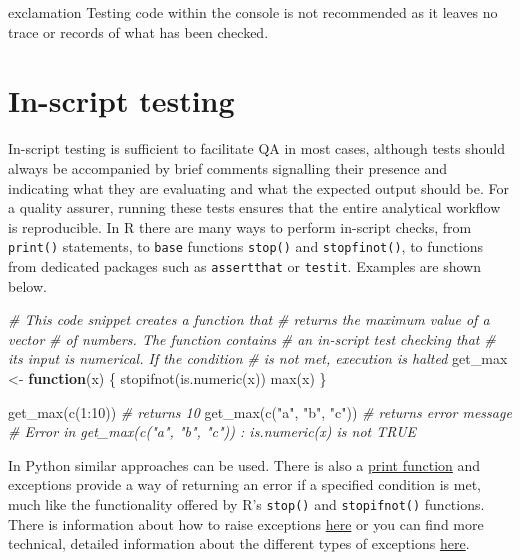 \documentclass[
]{book}
\newenvironment{Shaded}{\begin{snugshade}}{\end{snugshade}}
\newcommand{\CommentTok}[1]{\textcolor[rgb]{0.56,0.35,0.01}{\textit{#1}}}
\newcommand{\ControlFlowTok}[1]{\textcolor[rgb]{0.13,0.29,0.53}{\textbf{#1}}}
\newcommand{\DecValTok}[1]{\textcolor[rgb]{0.00,0.00,0.81}{#1}}
\newcommand{\FunctionTok}[1]{\textcolor[rgb]{0.00,0.00,0.00}{#1}}
\newcommand{\NormalTok}[1]{#1}
\newcommand{\OtherTok}[1]{\textcolor[rgb]{0.56,0.35,0.01}{#1}}
\newcommand{\SpecialCharTok}[1]{\textcolor[rgb]{0.00,0.00,0.00}{#1}}
\newcommand{\StringTok}[1]{\textcolor[rgb]{0.31,0.60,0.02}{#1}}
\begin{document}
\begin{infoboxred}exclamation
Testing code within the console is not recommended as it leaves no trace or records of what has been checked.

\end{infoboxred}

\hypertarget{in-script-testing}{%
\section{In-script testing}\label{in-script-testing}}

In-script testing is sufficient to facilitate QA in most cases, although tests should always be accompanied by brief comments signalling their presence and indicating what they are evaluating and what the expected output should be. For a quality assurer, running these tests ensures that the entire analytical workflow is reproducible. In R there are many ways to perform in-script checks, from \texttt{print()} statements, to \texttt{base} functions \texttt{stop()} and \texttt{stopfinot()}, to functions from dedicated packages such as \texttt{assertthat} or \texttt{testit}. Examples are shown below.

\begin{Shaded}
\begin{Highlighting}[]
\CommentTok{\# This code snippet creates a function that}
\CommentTok{\# returns the maximum value of a vector}
\CommentTok{\# of numbers. The function contains }
\CommentTok{\# an in{-}script test checking that}
\CommentTok{\# its input is numerical. If the condition}
\CommentTok{\# is not met, execution is halted}
\NormalTok{get\_max }\OtherTok{\textless{}{-}} \ControlFlowTok{function}\NormalTok{(x) \{}
  \FunctionTok{stopifnot}\NormalTok{(}\FunctionTok{is.numeric}\NormalTok{(x))}
  \FunctionTok{max}\NormalTok{(x)}
\NormalTok{\}}

\FunctionTok{get\_max}\NormalTok{(}\FunctionTok{c}\NormalTok{(}\DecValTok{1}\SpecialCharTok{:}\DecValTok{10}\NormalTok{))}
\CommentTok{\# returns 10}
\FunctionTok{get\_max}\NormalTok{(}\FunctionTok{c}\NormalTok{(}\StringTok{"a"}\NormalTok{, }\StringTok{"b"}\NormalTok{, }\StringTok{"c"}\NormalTok{))}
\CommentTok{\# returns error message}
\CommentTok{\# Error in get\_max(c("a", "b", "c")) : is.numeric(x) is not TRUE}
\end{Highlighting}
\end{Shaded}

In Python similar approaches can be used. There is also a \href{https://www.w3schools.com/python/ref_func_print.asp}{print function} and exceptions provide a way of returning an error if a specified condition is met, much like the functionality offered by R's \texttt{stop()} and \texttt{stopifnot()} functions. There is information about how to raise exceptions \href{https://www.w3schools.com/python/gloss_python_raise.asp}{here} or you can find more technical, detailed information about the different types of exceptions \href{https://docs.python.org/3/library/exceptions.html}{here}.
\end{document}
